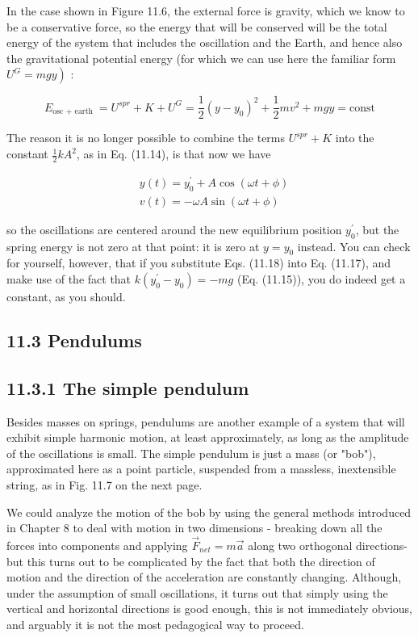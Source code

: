 \documentclass[10pt]{article}
\begin{document}
In the case shown in Figure 11.6, the external force is gravity, which we know to be a conservative force, so the energy that will be conserved will be the total energy of the system that includes the oscillation and the Earth, and hence also the gravitational potential energy (for which we can use here the familiar form $\left.U^{G}=m g y\right)$ :


\begin{equation*}
E_{\text {osc }+ \text { earth }}=U^{s p r}+K+U^{G}=\frac{1}{2}\left(y-y_{0}\right)^{2}+\frac{1}{2} m v^{2}+m g y=\mathrm{const} \tag{11.17}
\end{equation*}


The reason it is no longer possible to combine the terms $U^{s p r}+K$ into the constant $\frac{1}{2} k A^{2}$, as in Eq. (11.14), is that now we have


\begin{align*}
& y(t)=y_{0}^{\prime}+A \cos (\omega t+\phi) \\
& v(t)=-\omega A \sin (\omega t+\phi) \tag{11.18}
\end{align*}


so the oscillations are centered around the new equilibrium position $y_{0}^{\prime}$, but the spring energy is not zero at that point: it is zero at $y=y_{0}$ instead. You can check for yourself, however, that if you substitute Eqs. (11.18) into Eq. (11.17), and make use of the fact that $k\left(y_{0}^{\prime}-y_{0}\right)=-m g$ (Eq. (11.15)), you do indeed get a constant, as you should.

\subsection*{11.3 Pendulums}
\subsection*{11.3.1 The simple pendulum}
Besides masses on springs, pendulums are another example of a system that will exhibit simple harmonic motion, at least approximately, as long as the amplitude of the oscillations is small. The simple pendulum is just a mass (or "bob"), approximated here as a point particle, suspended from a massless, inextensible string, as in Fig. 11.7 on the next page.

We could analyze the motion of the bob by using the general methods introduced in Chapter 8 to deal with motion in two dimensions - breaking down all the forces into components and applying $\vec{F}_{n e t}=m \vec{a}$ along two orthogonal directions-but this turns out to be complicated by the fact that both the direction of motion and the direction of the acceleration are constantly changing. Although, under the assumption of small oscillations, it turns out that simply using the vertical and horizontal directions is good enough, this is not immediately obvious, and arguably it is not the most pedagogical way to proceed.
\end{document}
